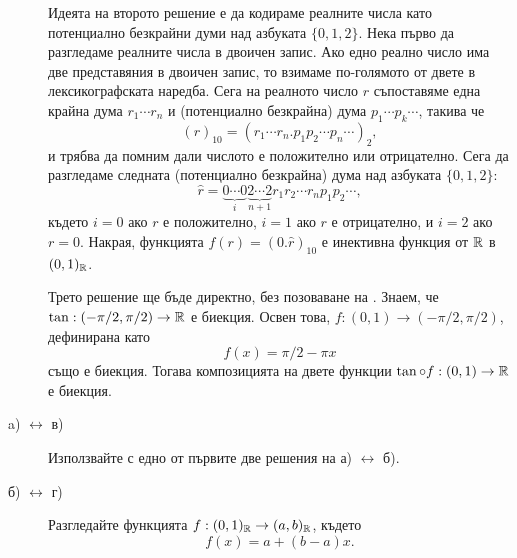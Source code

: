 \begin{hint}
\begin{description}
    Идеята на второто решение е да кодираме реалните числа като потенциално безкрайни думи
    над азбуката $\{0,1,2\}$. 
    Нека първо да разгледаме реалните числа в двоичен запис.
    Ако едно реално число има две представяния в двоичен запис, то взимаме по-голямото от двете в лексикографската наредба.
    Сега на реалното число $r$ съпоставяме една крайна дума $r_1\cdots r_n$ и (потенциално безкрайна) дума $p_1\cdots p_k\cdots$, такива че
    \[(r)_{10} = (r_1\cdots r_n.p_1p_2\cdots p_n \cdots)_2,\]
    и трябва да помним дали числото е положително или отрицателно.
    Сега да разгледаме следната (потенциално безкрайна) дума над азбуката $\{0,1,2\}$:
    \[\hat{r} = \underbrace{0\cdots 0}_{i}\underbrace{2\cdots 2}_{n+1}r_1r_2\cdots r_n p_1p_2\cdots, \]
    където $i = 0$ ако $r$ е положително, $i = 1$ ако $r$ е отрицателно, и $i = 2$ ако $r = 0$.
    Накрая, функцията $f(r) = (0.\hat{r})_{10}$ е инективна функция от $\mathbb{R}$ в $(0,1)_{\mathbb{R}}$.
    
    Трето решение ще бъде директно, без позоваване на .
    Знаем, че $\tan: (-\pi/2,\pi/2) \to \mathbb{R}$ е биекция.
    Освен това, $f: (0,1) \to (-\pi/2,\pi/2)$, дефинирана като
    \[f(x) = \pi/2 - \pi x\] също е биекция.
    Тогава композицията на двете функции $\tan\circ f : (0,1) \to \mathbb{R}$ е биекция.    
    
  \item[a) $\leftrightarrow$ в)]
    Използвайте  с едно от първите две решения на а) $\leftrightarrow$ б).
  \item[б) $\leftrightarrow$ г)]
    Разгледайте функцията $f: (0,1)_{\mathbb{R}} \to (a,b)_{\mathbb{R}}$, където
    \[f(x) = a + (b-a)x.\]
  \end{description}
\end{hint}


